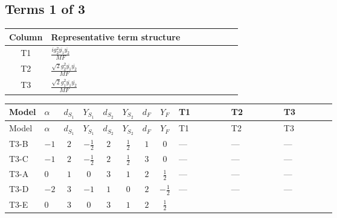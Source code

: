 \documentclass[8pt]{article}
\begin{document}
\begin{landscape}
\subsection*{Terms 1 of 3}
\begin{center}
\begin{tabular}{@{}c >{\raggedright\arraybackslash}p{0.82\linewidth}@{}}
\toprule
Column & Representative term structure \\
\midrule
T1 & \(\displaystyle \frac{i g_{2}^{2} \overline{y_{1}} \overline{y_{2}}}{MF}\) \\
\midrule
T2 & \(\displaystyle \frac{\sqrt{2} g_{2}^{2} \overline{y_{1}} \overline{y_{2}}}{MF}\) \\
\midrule
T3 & \(\displaystyle \frac{\sqrt{2} g_{1}^{2} \overline{y_{1}} \overline{y_{2}}}{MF}\) \\
\midrule
\bottomrule
\end{tabular}
\end{center}
\smallskip
\tiny
\begin{longtable}{@{}llcccccc >{\raggedright\arraybackslash}p{0.21\linewidth} >{\raggedright\arraybackslash}p{0.21\linewidth} >{\raggedright\arraybackslash}p{0.21\linewidth}@{}}
\toprule
Model & $\alpha$ & $d_{S_1}$ & $Y_{S_1}$ & $d_{S_2}$ & $Y_{S_2}$ & $d_F$ & $Y_F$ & T1 & T2 & T3 \\
\midrule
\endfirsthead
\toprule
Model & $\alpha$ & $d_{S_1}$ & $Y_{S_1}$ & $d_{S_2}$ & $Y_{S_2}$ & $d_F$ & $Y_F$ & T1 & T2 & T3 \\
\midrule
\endhead
T3-B & $-1$ & $2$ & $-\frac{1}{2}$ & $2$ & $\frac{1}{2}$ & $1$ & $0$ & --- & --- & --- \\
\midrule
T3-C & $-1$ & $2$ & $-\frac{1}{2}$ & $2$ & $\frac{1}{2}$ & $3$ & $0$ & --- & --- & --- \\
\midrule
T3-A & $0$ & $1$ & $0$ & $3$ & $1$ & $2$ & $\frac{1}{2}$ & --- & --- & --- \\
\midrule
T3-D & $-2$ & $3$ & $-1$ & $1$ & $0$ & $2$ & $-\frac{1}{2}$ & --- & --- & --- \\
\midrule
T3-E & $0$ & $3$ & $0$ & $3$ & $1$ & $2$ & $\frac{1}{2}$ & \scriptsize\adjustbox{max width=\linewidth}{$\begin{gathered} \frac{i g_{2}^{2} \overline{y_{1}} \overline{y_{2}}}{MF}\end{gathered}$} & \scriptsize\adjustbox{max width=\linewidth}{$\begin{gathered} - \frac{49 \sqrt{2} g_{2}^{2} \overline{y_{1}} \overline{y_{2}}}{16 MF}\end{gathered}$} & \scriptsize\adjustbox{max width=\linewidth}{$\begin{gathered} - \frac{3 \sqrt{2} g_{1}^{2} \overline{y_{1}} \overline{y_{2}}}{16 MF}\end{gathered}$} \\
\midrule
\bottomrule
\end{longtable}
\clearpage

\end{landscape}
\end{document}
